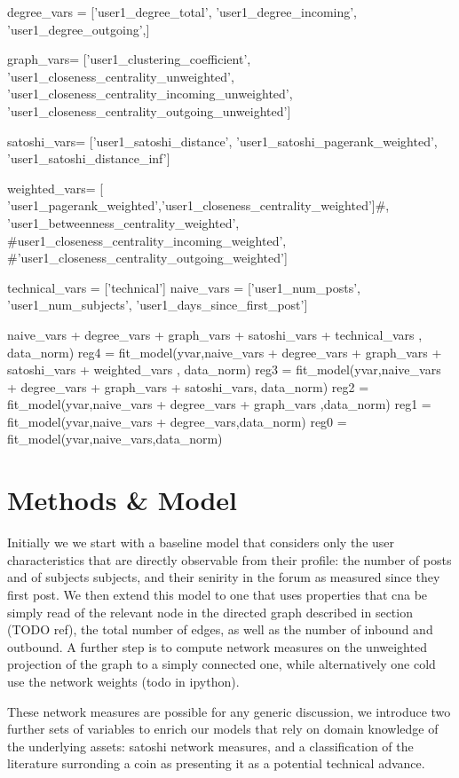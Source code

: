 
degree_vars = ['user1_degree_total',
           'user1_degree_incoming', 'user1_degree_outgoing',]

graph_vars=       ['user1_clustering_coefficient',
           'user1_closeness_centrality_unweighted',
           'user1_closeness_centrality_incoming_unweighted',
           'user1_closeness_centrality_outgoing_unweighted']

satoshi_vars=       ['user1_satoshi_distance',
            'user1_satoshi_pagerank_weighted',
            'user1_satoshi_distance_inf']

weighted_vars=       [ 'user1_pagerank_weighted','user1_closeness_centrality_weighted']#,  'user1_betweenness_centrality_weighted',
           #user1_closeness_centrality_incoming_weighted',
           #'user1_closeness_centrality_outgoing_weighted']

technical_vars = ['technical']
naive_vars = ['user1_num_posts', 'user1_num_subjects',
           'user1_days_since_first_post']
           
           

naive_vars  + degree_vars + graph_vars  + satoshi_vars + technical_vars , data_norm)
        reg4 =  fit_model(yvar,naive_vars  + degree_vars + graph_vars  + satoshi_vars + weighted_vars , data_norm)
        reg3 =  fit_model(yvar,naive_vars  + degree_vars + graph_vars  + satoshi_vars, data_norm)
        reg2 =  fit_model(yvar,naive_vars  + degree_vars + graph_vars ,data_norm)
        reg1 =  fit_model(yvar,naive_vars  + degree_vars,data_norm)
        reg0 = fit_model(yvar,naive_vars,data_norm)
        
\section{Methods & Model}

Initially we we start with a baseline model that considers only the user characteristics that are directly observable from their profile: the number of posts and of subjects subjects, and their senirity in the forum as measured since they first post.
We then extend this model to one that uses properties that cna be simply read of the relevant node in the directed graph described in section (TODO ref), the total number of edges, as well as the number of inbound and outbound.
A further step is to compute network measures on the unweighted projection of the graph to a simply connected one, while alternatively one cold use the network weights (todo in ipython). 

These network measures are possible for any generic discussion, we introduce two further sets of variables to enrich our models that rely on domain knowledge of the underlying assets: satoshi network measures, and a classification of the literature surronding a coin as presenting it as a potential technical advance.

